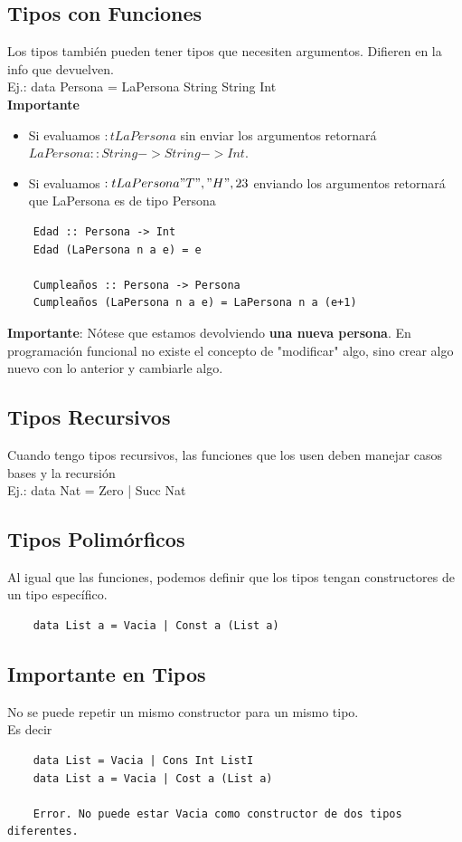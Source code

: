 \documentclass[10pt,a4paper]{article}
\begin{document}
\subsection*{Tipos con Funciones}
Los tipos también pueden tener tipos que necesiten argumentos. Difieren en la info que devuelven. \\
Ej.: data Persona = LaPersona String String Int \\
\textbf{Importante}
\begin{itemize}
    \item Si evaluamos $:t LaPersona$ sin enviar los argumentos retornará $LaPersona :: String -> String -> Int$. 
    \item Si evaluamos $:t LaPersona "T", "H", 23$ enviando los argumentos retornará que LaPersona es de tipo Persona
\end{itemize}
\begin{lstlisting}
    Edad :: Persona -> Int 
    Edad (LaPersona n a e) = e

    Cumpleaños :: Persona -> Persona 
    Cumpleaños (LaPersona n a e) = LaPersona n a (e+1)
\end{lstlisting}
\textbf{Importante}: Nótese que estamos devolviendo \textbf{una nueva persona}. En programación funcional no existe el concepto de "modificar" algo, sino crear algo nuevo con lo anterior y cambiarle algo.
\subsection*{Tipos Recursivos}
Cuando tengo tipos recursivos, las funciones que los usen deben manejar casos bases y la recursión \\
Ej.: data Nat = Zero | Succ Nat 
\subsection*{Tipos Polimórficos} 
Al igual que las funciones, podemos definir que los tipos tengan constructores de un tipo específico.
\begin{lstlisting}
    data List a = Vacia | Const a (List a)
\end{lstlisting}
\subsection*{Importante en Tipos}
No se puede repetir un mismo constructor para un mismo tipo. \\
Es decir
\begin{lstlisting}
    data List = Vacia | Cons Int ListI 
    data List a = Vacia | Cost a (List a)

    Error. No puede estar Vacia como constructor de dos tipos diferentes.
\end{lstlisting}
\end{document}
